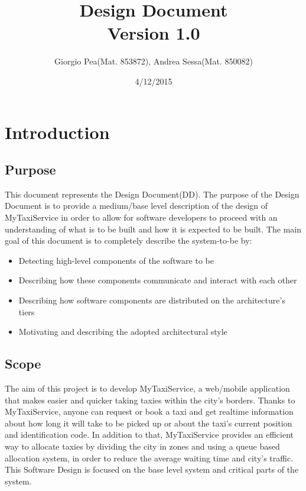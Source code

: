 \documentclass[11pt,titlepage]{article} %
\title{\textbf{D}esign \textbf{D}ocument \\ \vspace{1cm} \large{Version 1.0}}
\author{Giorgio Pea(Mat. 853872), Andrea Sessa(Mat. 850082)}
\date{4/12/2015}
\begin{document}
\maketitle

\newpage

\tableofcontents

\newpage

\section{Introduction}

\subsection{Purpose}
    This document represents the Design Document(DD).
    The purpose of the Design Document is to provide a medium/base level description of the design of MyTaxiService
    in order to allow for software developers to proceed with an understanding of what is to be
    built and how it is expected to be built.\newline
    The main goal of this document is to completely describe the system-to-be by:
    \begin{itemize}
      \item Detecting high-level components of the software to be
      \item Describing how these components communicate and interact with each other
      \item Describing how software components are distributed on the architecture's tiers
      \item Motivating and describing the adopted architectural style
   \end{itemize}

\subsection{Scope}
    The aim of this project is to develop MyTaxiService, a web/mobile application that
    makes easier and quicker taking taxies within the city’s borders. Thanks to MyTaxiService,
    anyone can request or book a taxi and get realtime information about how long
    it will take to be picked up or about the taxi’s current position and identification code.
    In addition to that, MyTaxiService provides an efficient way to allocate taxies by dividing
    the city in zones and using a queue based allocation system, in order to reduce the
    average waiting time and city’s traffic.\newline
    This Software Design is focused on the base level system and critical parts
    of the system.
\end{document}
